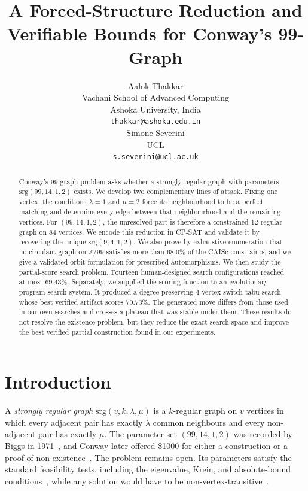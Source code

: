 \documentclass{article}
\title{A Forced-Structure Reduction and Verifiable Bounds for
Conway's 99-Graph}
\author{%
  Aalok Thakkar \\
  Vachani School of Advanced Computing\\
  Ashoka University, India\\
  \texttt{thakkar@ashoka.edu.in} \\
  \And
  Simone Severini \\
  UCL \\
  \texttt{s.severini@ucl.ac.uk} \\
}
\begin{document}
\maketitle

\begin{abstract}
Conway's 99-graph problem asks whether a strongly regular graph with parameters
$\mathrm{srg}(99,14,1,2)$ exists. We develop two complementary lines of
attack. Fixing one vertex, the conditions $\lambda=1$ and $\mu=2$ force its
neighbourhood to be a perfect matching and determine every edge between that
neighbourhood and the remaining vertices. For $(99,14,1,2)$, the unresolved
part is therefore a constrained $12$-regular graph on $84$ vertices. We encode
this reduction in CP-SAT and validate it by recovering the unique
$\mathrm{srg}(9,4,1,2)$. We also prove by exhaustive enumeration that no
circulant graph on $\mathbb{Z}/99$ satisfies more than $68.0\%$ of the CAISc
constraints, and we give a validated orbit formulation for prescribed
automorphisms. We then study the partial-score search problem. Fourteen human-designed search
configurations reached at most $69.43\%$. Separately, we supplied the scoring
function to an evolutionary program-search system. It produced a
degree-preserving $4$-vertex-switch tabu search whose best verified artifact
scores $70.73\%$. The generated move differs from those used in our own
searches and crosses a plateau that was stable under them. These results do not resolve the existence problem, but they reduce the exact
search space and improve the best verified partial construction found in our
experiments.
\end{abstract}

\section{Introduction}
A \emph{strongly regular graph} $\mathrm{srg}(v,k,\lambda,\mu)$ is a
$k$-regular graph on $v$ vertices in which every adjacent pair has exactly
$\lambda$ common neighbours and every non-adjacent pair has exactly $\mu$.
The parameter set $(99,14,1,2)$ was recorded by Biggs in
1971~\cite{biggs1971}, and Conway later offered \$1000 for either a
construction or a proof of non-existence~\cite{conway2017,wiki99}. The problem
remains open. Its parameters satisfy the standard feasibility tests, including
the eigenvalue, Krein, and absolute-bound conditions~\cite{brouwertab,bcn1989},
while any solution would have to be non-vertex-transitive~\cite{cesarz2023}.
\end{document}
